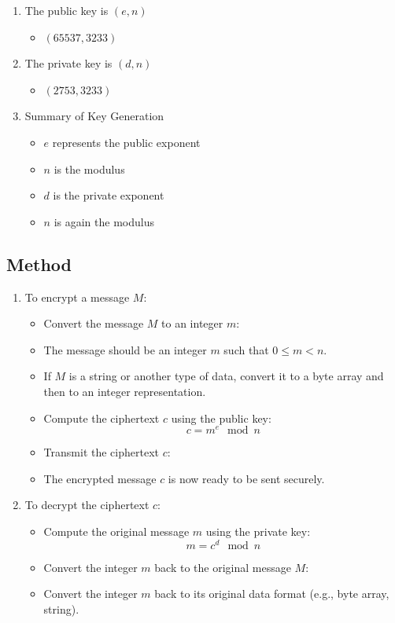 \documentclass[11pt]{article}
\begin{document}
\begin{enumerate}
    \begin{itemize}
        \item $d \times e \equiv 1 \pmod{\phi(n)}$
        \item Example: $d \times 65537 \equiv 1 \pmod{3120} \Rightarrow d = 2753$
    \end{itemize}
    \item The public key is $(e,n)$
    \begin{itemize}
        \item $(65537, 3233)$
    \end{itemize}
    \item The private key is $(d, n)$
    \begin{itemize}
        \item $(2753, 3233)$
    \end{itemize}
    \item Summary of Key Generation
    \begin{itemize}
        \item $e$ represents the public exponent
        \item $n$ is the modulus
        \item $d$ is the private exponent
        \item $n$ is again the modulus
    \end{itemize}
\end{enumerate}

\subsection{Method}
\begin{enumerate}
    \item To encrypt a message $M$:
    \begin{itemize}
        \item Convert the message $M$ to an integer $m$:
        \item The message should be an integer $m$ such that $0 \leq m < n$.
        \item If $M$ is a string or another type of data, convert it to a byte array and then to an integer representation.
        \item Compute the ciphertext $c$ using the public key:
        \[
        c = m^e \mod n
        \]
        \item Transmit the ciphertext $c$:
        \item The encrypted message $c$ is now ready to be sent securely.
    \end{itemize}
    
    \item To decrypt the ciphertext $c$:
    \begin{itemize}
        \item Compute the original message $m$ using the private key:
        \[
        m = c^d \mod n
        \]
        \item Convert the integer $m$ back to the original message $M$:
        \item Convert the integer $m$ back to its original data format (e.g., byte array, string).
    \end{itemize}
\end{enumerate}
\end{document}
